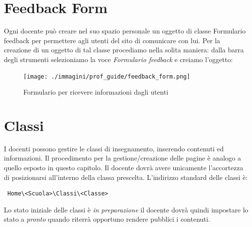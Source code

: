 \section{Feedback Form}

Ogni docente può creare nel suo spazio personale un oggetto di classe Formulario feedback per permettere agli utenti del sito di comunicare con lui. Per la creazione di un oggetto di tal classe procediamo nella solita maniera: dalla barra degli strumenti selezioniamo la voce \textsl{Formulario feedback} e creiamo l'oggetto:
\begin{figure}[H]
 \centering
 \texttt{[image: ./immagini/prof\_guide/feedback\_form.png]}
 \caption{Formulario per ricevere informazioni dagli utenti}
 \label{fig:feedback_form}
\end{figure}
\section{Classi}

I docenti possono gestire le classi di insegnamento, inserendo contenuti ed informazioni. Il procedimento per la gestione/creazione delle pagine è analogo a quello esposto in questo capitolo. Il docente dovrà avere unicamente l'accortezza di posizionarsi all'interno della classa prescelta. L'indirizzo standard delle classi è:
\begin{verbatim}
 Home\<Scuola>\Classi\<Classe>
\end{verbatim}
Lo stato iniziale delle classi è \textsl{in preparazione} il docente dovrà quindi impostare lo stato a \textsl{pronto} quando riterrà opportuno rendere pubblici i contenuti.